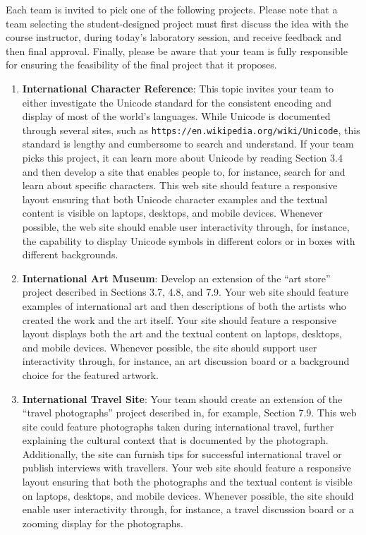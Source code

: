 \documentclass[11pt]{article}
\newcommand{\url}[1]{\lstinline{#1}}
\begin{document}
Each team is invited to pick one of the following projects. Please note that a
team selecting the student-designed project must first discuss the idea with the
course instructor, during today's laboratory session, and receive feedback and
then final approval. Finally, please be aware that your team is fully
responsible for ensuring the feasibility of the final project that it proposes.

\begin{enumerate}

  \setlength{\itemsep}{0in}

  \item {\bf International Character Reference}: This topic invites your team to
    either investigate the Unicode standard for the consistent encoding and
    display of most of the world's languages. While Unicode is documented
    through several sites, such as \url{https://en.wikipedia.org/wiki/Unicode},
    this standard is lengthy and cumbersome to search and understand. If your
    team picks this project, it can learn more about Unicode by reading Section
    3.4 and then develop a site that enables people to, for instance, search for
    and learn about specific characters. This web site should feature a
    responsive layout ensuring that both Unicode character examples and the
    textual content is visible on laptops, desktops, and mobile devices.
    Whenever possible, the web site should enable user interactivity through,
    for instance, the capability to display Unicode symbols in different colors
    or in boxes with different backgrounds.

  \item {\bf International Art Museum}: Develop an extension of the ``art
    store'' project described in Sections 3.7, 4.8, and 7.9. Your web site
    should feature examples of international art and then descriptions of both
    the artists who created the work and the art itself. Your site should
    feature a responsive layout displays both the art and the textual content on
    laptops, desktops, and mobile devices. Whenever possible, the site should
    support user interactivity through, for instance, an art discussion board or
    a background choice for the featured artwork.

  \item {\bf International Travel Site}: Your team should create an extension of
    the ``travel photographs'' project described in, for example, Section 7.9.
    This web site could feature photographs taken during international travel,
    further explaining the cultural context that is documented by the
    photograph. Additionally, the site can furnish tips for successful
    international travel or publish interviews with travellers. Your web site
    should feature a responsive layout ensuring that both the photographs and
    the textual content is visible on laptops, desktops, and mobile devices.
    Whenever possible, the site should enable user interactivity through, for
    instance, a travel discussion board or a zooming display for the photographs.


\end{enumerate}
\end{document}
